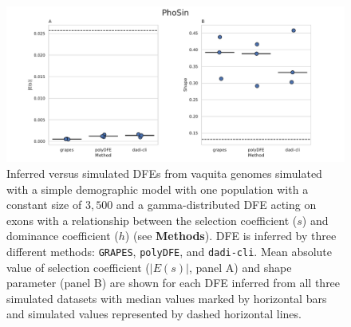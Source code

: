 \documentclass[hidelinks]{article}
\newcommand{\polydfe}{\texttt{polyDFE}\xspace}
\newcommand{\dadicli}{\texttt{dadi-cli}\xspace}
\newcommand{\grapes}{\texttt{GRAPES}\xspace}
\begin{document}
\begin{figure}[h]
    \centering
    \includegraphics[width=\textwidth]{figures/PhoSin/Constant/PhoSin_Constant_Gamma_R22_Phocoena_sinus.mPhoSin1.pri.110_exons_DFE_plot.pdf}
    \caption{
    \label{fig:vaquita-dfe.constant}
        Inferred versus simulated DFEs from vaquita genomes simulated with
        a simple demographic model with one population with a constant size of $3,500$
        and a gamma-distributed DFE acting on exons
        with a relationship between the selection coefficient ($s$) and dominance coefficient ($h$) (see \textbf{Methods}).
        DFE is inferred by three different methods: \grapes, \polydfe , and \dadicli.
        Mean absolute value of selection coefficient ($\lvert E(s) \rvert$, panel A) and shape parameter (panel B)
        are shown for each DFE inferred from all three simulated datasets
        with median values marked by horizontal bars
        and simulated values represented by dashed horizontal lines.
    }
\end{figure}

\end{document}
